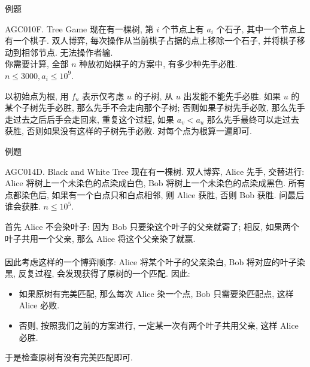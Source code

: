 \documentclass{beamer}
\newcommand{\nl}{\\\hspace*{\fill}\\}
\begin{document}
	\begin{frame}{例题}
		\begin{block}{AGC010F. Tree Game}
			现在有一棵树, 第 $i$ 个节点上有 $a_i$ 个石子, 其中一个节点上有一个棋子. 双人博弈, 每次操作从当前棋子占据的点上移除一个石子, 并将棋子移动到相邻节点. 无法操作者输.\\
			你需要计算, 全部 $n$ 种放初始棋子的方案中, 有多少种先手必胜.\\
			$n\leq 3000,a_i\leq 10^9$.
		\end{block}
		\pause
		以初始点为根, 用 $f_u$ 表示仅考虑 $u$ 的子树, 从 $u$ 出发能不能先手必胜. 如果 $u$ 的某个子树先手必胜, 那么先手不会走向那个子树; 否则如果子树先手必败, 那么先手走过去之后后手会走回来, 重复这个过程, 如果 $a_v<a_u$ 那么先手最终可以走过去获胜, 否则如果没有这样的子树先手必败. 对每个点为根算一遍即可.
	\end{frame}

	\begin{frame}{例题}
		\begin{block}{AGC014D. Black and White Tree}
			现在有一棵树. 双人博弈, Alice 先手, 交替进行: Alice 将树上一个未染色的点染成白色, Bob 将树上一个未染色的点染成黑色. 所有点都染色后, 如果有一个白点只和白点相邻, 则 Alice 获胜, 否则 Bob 获胜. 问最后谁会获胜.
			$n\leq 10^5$.
		\end{block}
		\pause
		首先 Alice 不会染叶子: 因为 Bob 只要染这个叶子的父亲就寄了; 相反, 如果两个叶子共用一个父亲, 那么 Alice 将这个父亲染了就赢.\nl
		因此考虑这样的一个博弈顺序: Alice 将某个叶子的父亲染白, Bob 将对应的叶子染黑, 反复过程, 会发现获得了原树的一个匹配. 因此:\\
		\begin{itemize}
			\item 如果原树有完美匹配, 那么每次 Alice 染一个点, Bob 只需要染匹配点, 这样 Alice 必败.\\
			\item 否则, 按照我们之前的方案进行, 一定某一次有两个叶子共用父亲, 这样 Alice 必胜.\\
		\end{itemize}
		于是检查原树有没有完美匹配即可.
	\end{frame}
\end{document}
